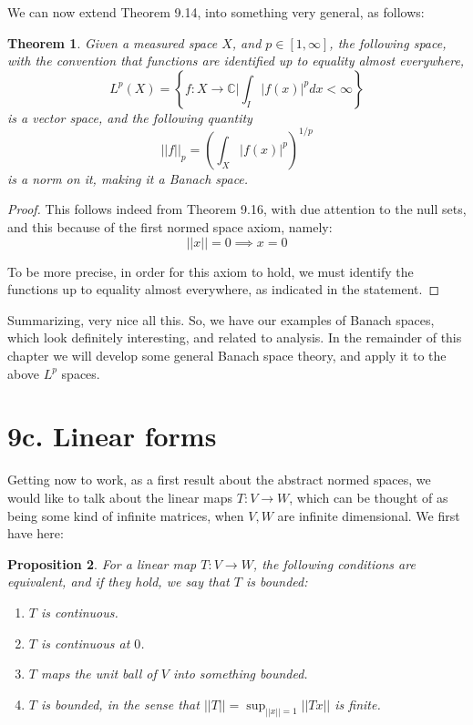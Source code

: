 \documentclass[12pt]{amsbook}
\newtheorem{theorem}{Theorem}[chapter]
\newtheorem{proposition}[theorem]{Proposition}
\begin{document}
We can now extend Theorem 9.14, into something very general, as follows:


\begin{theorem}
Given a measured space $X$, and $p\in[1,\infty]$, the following space, with the convention that functions are identified up to equality almost everywhere,
$$L^p(X)=\left\{f:X\to\mathbb C\Big|\int_I|f(x)|^pdx<\infty\right\}$$
is a vector space, and the following quantity
$$||f||_p=\left(\int_X|f(x)|^p\right)^{1/p}$$
is a norm on it, making it a Banach space.
\end{theorem}

\begin{proof}
This follows indeed from Theorem 9.16, with due attention to the null sets, and this because of the first normed space axiom, namely:
$$||x||=0\implies x=0$$

To be more precise, in order for this axiom to hold, we must identify the functions up to equality almost everywhere, as indicated in the statement.
\end{proof}

Summarizing, very nice all this. So, we have our examples of Banach spaces, which look definitely interesting, and related to analysis. In the remainder of this chapter we will develop some general Banach space theory, and apply it to the above $L^p$ spaces.

\section*{9c. Linear forms}

Getting now to work, as a first result about the abstract normed spaces, we would like to talk about the linear maps $T:V\to W$, which can be thought of as being some kind of infinite matrices, when $V,W$ are infinite dimensional. We first have here:

\begin{proposition}
For a linear map $T:V\to W$, the following conditions are equivalent, and if they hold, we say that $T$ is bounded:
\begin{enumerate}
\item $T$ is continuous.

\item $T$ is continuous at $0$.

\item $T$ maps the unit ball of $V$ into something bounded.

\item $T$ is bounded, in the sense that $||T||=\sup_{||x||=1}||Tx||$ is finite.
\end{enumerate}
\end{proposition}
\end{document}
